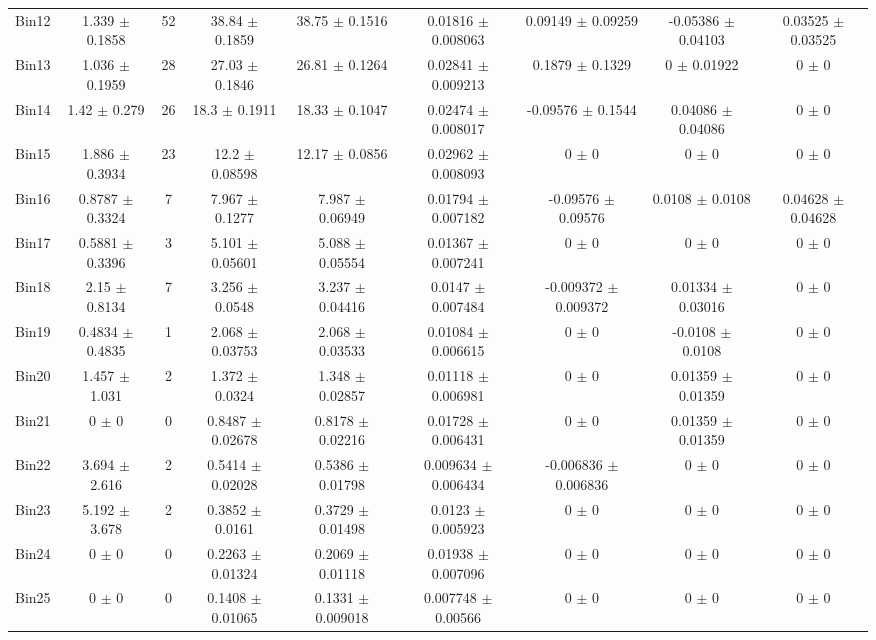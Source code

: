\begin{tabular}{@{\extracolsep{4pt}}lcccccccc@{}}
     Bin12 & 1.339 $\pm$ 0.1858 & 52 & 38.84 $\pm$ 0.1859 & 38.75 $\pm$ 0.1516 & 0.01816 $\pm$ 0.008063 & 0.09149 $\pm$ 0.09259 & -0.05386 $\pm$ 0.04103 & 0.03525 $\pm$ 0.03525 \\ 
     Bin13 & 1.036 $\pm$ 0.1959 & 28 & 27.03 $\pm$ 0.1846 & 26.81 $\pm$ 0.1264 & 0.02841 $\pm$ 0.009213 & 0.1879 $\pm$ 0.1329 & 0 $\pm$ 0.01922 & 0 $\pm$ 0 \\ 
     Bin14 & 1.42 $\pm$ 0.279 & 26 & 18.3 $\pm$ 0.1911 & 18.33 $\pm$ 0.1047 & 0.02474 $\pm$ 0.008017 & -0.09576 $\pm$ 0.1544 & 0.04086 $\pm$ 0.04086 & 0 $\pm$ 0 \\ 
     Bin15 & 1.886 $\pm$ 0.3934 & 23 & 12.2 $\pm$ 0.08598 & 12.17 $\pm$ 0.0856 & 0.02962 $\pm$ 0.008093 & 0 $\pm$ 0 & 0 $\pm$ 0 & 0 $\pm$ 0 \\ 
     Bin16 & 0.8787 $\pm$ 0.3324 & 7 & 7.967 $\pm$ 0.1277 & 7.987 $\pm$ 0.06949 & 0.01794 $\pm$ 0.007182 & -0.09576 $\pm$ 0.09576 & 0.0108 $\pm$ 0.0108 & 0.04628 $\pm$ 0.04628 \\ 
     Bin17 & 0.5881 $\pm$ 0.3396 & 3 & 5.101 $\pm$ 0.05601 & 5.088 $\pm$ 0.05554 & 0.01367 $\pm$ 0.007241 & 0 $\pm$ 0 & 0 $\pm$ 0 & 0 $\pm$ 0 \\ 
     Bin18 & 2.15 $\pm$ 0.8134 & 7 & 3.256 $\pm$ 0.0548 & 3.237 $\pm$ 0.04416 & 0.0147 $\pm$ 0.007484 & -0.009372 $\pm$ 0.009372 & 0.01334 $\pm$ 0.03016 & 0 $\pm$ 0 \\ 
     Bin19 & 0.4834 $\pm$ 0.4835 & 1 & 2.068 $\pm$ 0.03753 & 2.068 $\pm$ 0.03533 & 0.01084 $\pm$ 0.006615 & 0 $\pm$ 0 & -0.0108 $\pm$ 0.0108 & 0 $\pm$ 0 \\ 
     Bin20 & 1.457 $\pm$ 1.031 & 2 & 1.372 $\pm$ 0.0324 & 1.348 $\pm$ 0.02857 & 0.01118 $\pm$ 0.006981 & 0 $\pm$ 0 & 0.01359 $\pm$ 0.01359 & 0 $\pm$ 0 \\ 
     Bin21 & 0 $\pm$ 0 & 0 & 0.8487 $\pm$ 0.02678 & 0.8178 $\pm$ 0.02216 & 0.01728 $\pm$ 0.006431 & 0 $\pm$ 0 & 0.01359 $\pm$ 0.01359 & 0 $\pm$ 0 \\ 
     Bin22 & 3.694 $\pm$ 2.616 & 2 & 0.5414 $\pm$ 0.02028 & 0.5386 $\pm$ 0.01798 & 0.009634 $\pm$ 0.006434 & -0.006836 $\pm$ 0.006836 & 0 $\pm$ 0 & 0 $\pm$ 0 \\ 
     Bin23 & 5.192 $\pm$ 3.678 & 2 & 0.3852 $\pm$ 0.0161 & 0.3729 $\pm$ 0.01498 & 0.0123 $\pm$ 0.005923 & 0 $\pm$ 0 & 0 $\pm$ 0 & 0 $\pm$ 0 \\ 
     Bin24 & 0 $\pm$ 0 & 0 & 0.2263 $\pm$ 0.01324 & 0.2069 $\pm$ 0.01118 & 0.01938 $\pm$ 0.007096 & 0 $\pm$ 0 & 0 $\pm$ 0 & 0 $\pm$ 0 \\ 
     Bin25 & 0 $\pm$ 0 & 0 & 0.1408 $\pm$ 0.01065 & 0.1331 $\pm$ 0.009018 & 0.007748 $\pm$ 0.00566 & 0 $\pm$ 0 & 0 $\pm$ 0 & 0 $\pm$ 0 \\ 

\end{tabular}
